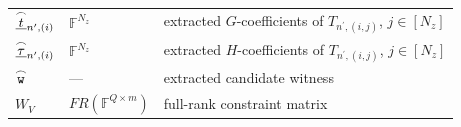 \documentclass{article}
\theoremstyle{definition}
\newcommand{\FF}{\mathbb{F}}
\begin{document}
\begin{longtable}{|p{}|p{}|p{}|}
$\underline{\overset{\LARGE\frown}{t}}_{n^\prime,(i)}$ & $\FF^{N_z}$ & extracted $G$-coefficients of $T_{n^\prime,(i,j)}$, $j \in [N_z]$ \\
$\underline{\overset{\LARGE\frown}{\tau}}_{n^\prime,(i)}$ & $\FF^{N_z}$ & extracted $H$-coefficients of $T_{n^\prime,(i,j)}$, $j \in [N_z]$ \\
$\overset{\LARGE\frown}{\texttt{w}}$ & --- & extracted candidate witness \\
$W_V$ & $FR(\FF^{Q \times m})$ & full-rank constraint matrix \\
\hline
\end{longtable}






\end{document}
